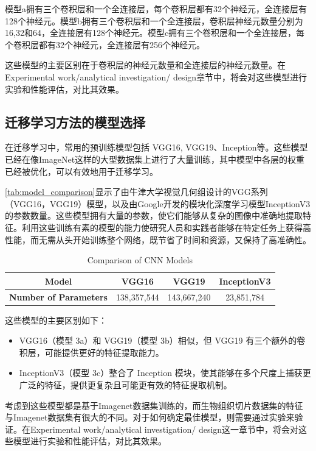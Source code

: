 模型a拥有三个卷积层和一个全连接层，每个卷积层都有32个神经元，全连接层有128个神经元。模型b拥有三个卷积层和一个全连接层，卷积层神经元数量分别为16,32和64，全连接层有128个神经元。模型c拥有三个卷积层和一个全连接层，每个卷积层都有32个神经元，全连接层有256个神经元。

这些模型的主要区别在于卷积层的神经元数量和全连接层的神经元数量。在Experimental work/analytical investigation/ design章节中，将会对这些模型进行实验和性能评估，对比其效果。

\subsection{迁移学习方法的模型选择}

在迁移学习中，常用的预训练模型包括 VGG16, VGG19、Inception等。这些模型已经在像ImageNet这样的大型数据集上进行了大量训练，其中模型中各层的权重已经被优化，可以有效地用于迁移学习。\cite{4.30 7}

\autoref{tab:model_comparison}显示了由牛津大学视觉几何组设计的VGG系列（VGG16，VGG19）模型\cite{DL.5}，以及由Google开发的模块化深度学习模型InceptionV3 \cite{DL.6}\cite{DL.7}的参数数量。这些模型拥有大量的参数，使它们能够从复杂的图像中准确地提取特征。利用这些训练有素的模型的能力使研究人员和实践者能够在特定任务上获得高性能，而无需从头开始训练整个网络，既节省了时间和资源，又保持了高准确性。\cite{4.30 8}

\begin{table}[H]
    \centering
    \caption{Comparison of CNN Models}
    \label{tab:model_comparison}
    \begin{tabular}{cccc}
        \toprule
        \textbf{Model} & \textbf{VGG16} & \textbf{VGG19} & \textbf{InceptionV3}\\
        \midrule
        \textbf{Number of Parameters} & 138,357,544 & 143,667,240 & 23,851,784 \\
        \bottomrule
    \end{tabular}
\end{table}

这些模型的主要区别如下：

\begin{itemize}
    \item VGG16（模型 3a）和 VGG19（模型 3b）相似，但 VGG19 有三个额外的卷积层，可能提供更好的特征提取能力。
    \item InceptionV3（模型 3c）整合了 Inception 模块，使其能够在多个尺度上捕获更广泛的特征，提供更复杂且可能更有效的特征提取机制。
\end{itemize}

考虑到这些模型都是基于Imagenet数据集训练的，而生物组织切片数据集的特征与Imagenet数据集有很大的不同。对于如何确定最佳模型，则需要通过实验来验证。在Experimental work/analytical investigation/ design这一章节中，将会对这些模型进行实验和性能评估，对比其效果。






